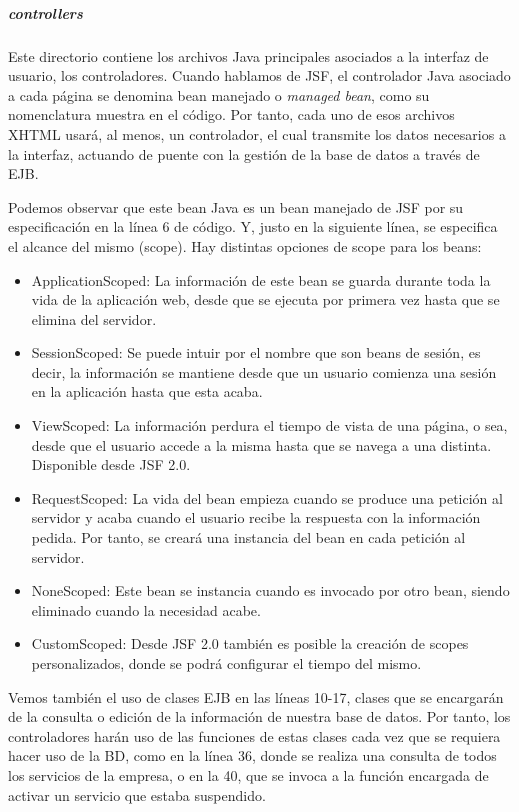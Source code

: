 \subparagraph{\textit{controllers}}

Este directorio contiene los archivos Java principales asociados a la interfaz de usuario, los controladores. Cuando hablamos de JSF, el controlador Java asociado a cada página se denomina bean manejado o \textit{managed bean}, como su nomenclatura muestra en el código. Por tanto, cada uno de esos archivos XHTML usará, al menos, un controlador, el cual transmite los datos necesarios a la interfaz, actuando de puente con la gestión de la base de datos a través de EJB.



Podemos observar que este bean Java es un bean manejado de JSF por su especificación en la línea 6 de código. Y, justo en la siguiente línea, se especifica el alcance del mismo (scope). Hay distintas opciones de scope para los beans: 

\begin{itemize}
\item ApplicationScoped: La información de este bean se guarda durante toda la vida de la aplicación web, desde que se ejecuta por primera vez hasta que se elimina del servidor. 
\item SessionScoped: Se puede intuir por el nombre que son beans de sesión, es decir, la información se mantiene desde que un usuario comienza una sesión en la aplicación hasta que esta acaba.
\item ViewScoped: La información perdura el tiempo de vista de una página, o sea, desde que el usuario accede a la misma hasta que se navega a una distinta. Disponible desde JSF 2.0.
\item RequestScoped: La vida del bean empieza cuando se produce una petición al servidor y acaba cuando el usuario recibe la respuesta con la información pedida. Por tanto, se creará una instancia del bean en cada petición al servidor.
\item NoneScoped: Este bean se instancia cuando es invocado por otro bean, siendo eliminado cuando la necesidad acabe.
\item CustomScoped: Desde JSF 2.0 también es posible la creación de scopes personalizados, donde se podrá configurar el tiempo del mismo. 
\end{itemize}

Vemos también el uso de clases EJB en las líneas 10-17, clases que se encargarán de la consulta o edición de la información de nuestra base de datos. Por tanto, los controladores harán uso de las funciones de estas clases cada vez que se requiera hacer uso de la BD, como en la línea 36, donde se realiza una consulta de todos los servicios de la empresa, o en la 40, que se invoca a la función encargada de activar un servicio que estaba suspendido. 


